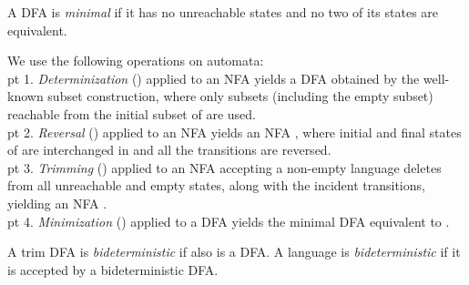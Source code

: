 \documentclass[preprint,12pt]{elsarticle}
\begin{document}
A DFA is \emph{minimal} if it has no unreachable states and 
no two of its states are equivalent.



We use the following operations on automata: \\
 pt 1.
\emph{Determinization} () 
applied to an NFA  yields a DFA  obtained by the well-known subset construction, where only subsets (including the empty subset) reachable from the initial subset of  are used. \\
 pt 2.
 \emph{Reversal} () applied to an NFA  yields an NFA , where initial and final states of  
are interchanged in  and all the transitions  
are reversed. \\
 pt 3.
\emph{Trimming} () applied to an NFA  accepting 
a non-empty language deletes from  all unreachable and empty states,
along with the incident transitions, yielding an NFA . \\
 pt 4.
\emph{Minimization}  () applied to a DFA  yields 
the minimal DFA  equivalent to .

A trim DFA  is \emph{bideterministic} if also  is a DFA.
A language is \emph{bideterministic} if it is accepted by a bideterministic 
DFA.
\end{document}
